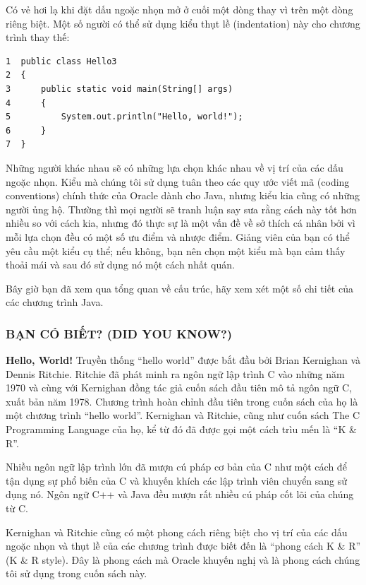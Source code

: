 Có vẻ hơi lạ khi đặt dấu ngoặc nhọn mở ở cuối một dòng thay vì trên một
dòng riêng biệt. Một số người có thể sử dụng kiểu thụt lề (indentation)
này cho chương trình thay thế:

\begin{verbatim}
1  public class Hello3
2  {
3      public static void main(String[] args)
4      {
5          System.out.println("Hello, world!");
6      }
7  }
\end{verbatim}

Những người khác nhau sẽ có những lựa chọn khác nhau về vị trí của các
dấu ngoặc nhọn. Kiểu mà chúng tôi sử dụng tuân theo các quy ước viết mã
(coding conventions) chính thức của Oracle dành cho Java, nhưng kiểu kia
cũng có những người ủng hộ. Thường thì mọi người sẽ tranh luận say sưa
rằng cách này tốt hơn nhiều so với cách kia, nhưng đó thực sự là một vấn
đề về sở thích cá nhân bởi vì mỗi lựa chọn đều có một số ưu điểm và
nhược điểm. Giảng viên của bạn có thể yêu cầu một kiểu cụ thể; nếu
không, bạn nên chọn một kiểu mà bạn cảm thấy thoải mái và sau đó sử dụng
nó một cách nhất quán.

Bây giờ bạn đã xem qua tổng quan về cấu trúc, hãy xem xét một số chi
tiết của các chương trình Java.

\subsubsection{BẠN CÓ BIẾT? (DID YOU
KNOW?)}\label{bux1ea1n-cuxf3-biux1ebft-did-you-know}

\textbf{Hello, World!} Truyền thống ``hello world'' được bắt đầu bởi
Brian Kernighan và Dennis Ritchie. Ritchie đã phát minh ra ngôn ngữ lập
trình C vào những năm 1970 và cùng với Kernighan đồng tác giả cuốn sách
đầu tiên mô tả ngôn ngữ C, xuất bản năm 1978. Chương trình hoàn chỉnh
đầu tiên trong cuốn sách của họ là một chương trình ``hello world''.
Kernighan và Ritchie, cũng như cuốn sách The C Programming Language của
họ, kể từ đó đã được gọi một cách trìu mến là ``K \& R''.

Nhiều ngôn ngữ lập trình lớn đã mượn cú pháp cơ bản của C như một cách
để tận dụng sự phổ biến của C và khuyến khích các lập trình viên chuyển
sang sử dụng nó. Ngôn ngữ C++ và Java đều mượn rất nhiều cú pháp cốt lõi
của chúng từ C.

Kernighan và Ritchie cũng có một phong cách riêng biệt cho vị trí của
các dấu ngoặc nhọn và thụt lề của các chương trình được biết đến là
``phong cách K \& R'' (K \& R style). Đây là phong cách mà Oracle khuyến
nghị và là phong cách chúng tôi sử dụng trong cuốn sách này.

